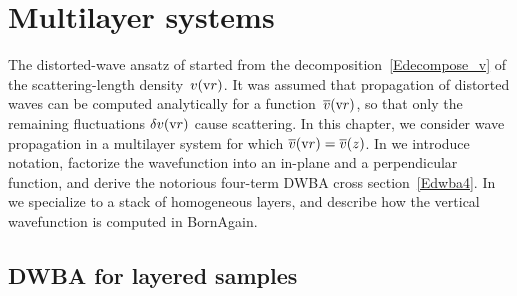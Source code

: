 

\chapter{Multilayer systems}  \label{sec:Multilayers}

%

The distorted-wave ansatz of  started from the decomposition~\cref{Edecompose_v}
of the scattering-length density~$v(\text{v}{r})$.
It was assumed that propagation of distorted waves can be computed analytically for
a function~$\overline{v}(\text{v}{r})$,
so that only the remaining fluctuations $\delta v(\text{v}{r})$ cause scattering.
In this chapter, we consider wave propagation in a multilayer system for which
$\overline{v}(\text{v}{r})=\overline{v}(z)$.
In  we introduce notation,
factorize the wavefunction into an in-plane and a perpendicular function,
and derive the notorious four-term DWBA cross section~\cref{Edwba4}.
In  we specialize to a stack of homogeneous layers,
and describe how the vertical wavefunction is computed in BornAgain.




\section{DWBA for layered samples}\label{Swave21}

